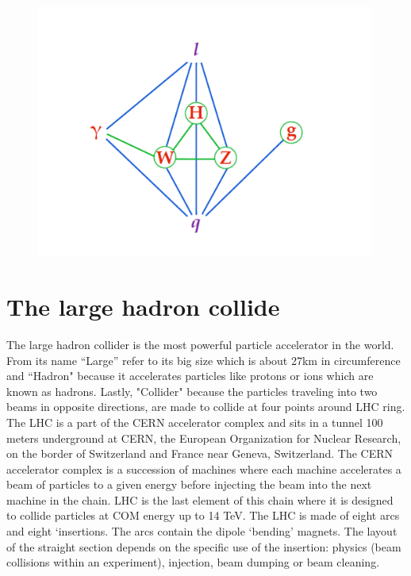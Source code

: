 \begin{figure}[t!]
\centering
\includegraphics[width=0.99\textwidth]{figures/SM_coupling.png}
\caption[interactions between fundamental particles]{
\label{fig:SMcoupling}}
\end{figure}
\section{The large hadron collide}
The large hadron collider is the most powerful particle accelerator in the world. From its name “Large” refer to its big size which is about 27km in circumference and “Hadron" because it accelerates particles like protons or ions which are known as hadrons.
Lastly, "Collider" because the particles traveling into two beams in opposite directions, are made to collide at four points around LHC ring.  
The LHC is a part of the CERN accelerator complex and sits in a tunnel 100 meters underground at CERN, the European Organization for Nuclear Research, on the border of Switzerland and France near Geneva, Switzerland.   
The CERN accelerator complex is a succession of machines where each machine accelerates a beam of particles to a given energy before injecting the beam into the next machine in the chain. LHC is the last element of this chain where it is designed to collide particles at COM energy up to 14 TeV.
The LHC is made of eight arcs and eight ‘insertions. The arcs contain the dipole ‘bending’ magnets. The layout of the straight section depends on the specific use of the insertion: physics (beam collisions within an experiment), injection, beam dumping or beam cleaning.

